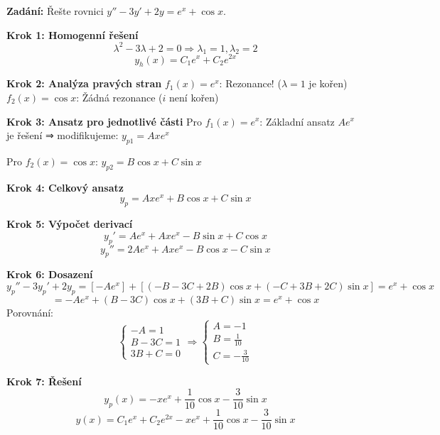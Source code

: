 \begin{example}
\label{ex:kombinace-exp-goniom}

\noindent\textbf{Zadání:} Řešte rovnici $y'' - 3y' + 2y = e^{x} + \cos x$.

\vspace{1.5\baselineskip}

\noindent\textbf{Krok 1: Homogenní řešení}
\[
\lambda^2 - 3\lambda + 2 = 0 \Rightarrow \lambda_1 = 1, \lambda_2 = 2
\]
\[
y_h(x) = C_1 e^{x} + C_2 e^{2x}
\]

\vspace{1\baselineskip}

\noindent\textbf{Krok 2: Analýza pravých stran}
$f_1(x) = e^{x}$: Rezonance! ($\lambda = 1$ je kořen)
$f_2(x) = \cos x$: Žádná rezonance ($i$ není kořen)

\vspace{1\baselineskip}

\noindent\textbf{Krok 3: Ansatz pro jednotlivé části}
Pro $f_1(x) = e^{x}$: Základní ansatz $Ae^{x}$ je řešení ⇒ modifikujeme: $y_{p1} = Axe^{x}$

Pro $f_2(x) = \cos x$: $y_{p2} = B\cos x + C\sin x$

\vspace{1\baselineskip}

\noindent\textbf{Krok 4: Celkový ansatz}
\[
y_p = Axe^{x} + B\cos x + C\sin x
\]

\vspace{1\baselineskip}

\noindent\textbf{Krok 5: Výpočet derivací}
\[
y_p' = Ae^{x} + Axe^{x} - B\sin x + C\cos x
\]
\[
y_p'' = 2Ae^{x} + Axe^{x} - B\cos x - C\sin x
\]

\vspace{1\baselineskip}

\noindent\textbf{Krok 6: Dosazení}
\[
y_p'' - 3y_p' + 2y_p = [-Ae^{x}] + [(-B - 3C + 2B)\cos x + (-C + 3B + 2C)\sin x] = e^{x} + \cos x
\]
\[
= -Ae^{x} + (B - 3C)\cos x + (3B + C)\sin x = e^{x} + \cos x
\]
Porovnání:
\[
\begin{cases}
-A = 1 \\
B - 3C = 1 \\
3B + C = 0
\end{cases}
\Rightarrow
\begin{cases}
A = -1 \\
B = \frac{1}{10} \\
C = -\frac{3}{10}
\end{cases}
\]

\vspace{1\baselineskip}

\noindent\textbf{Krok 7: Řešení}
\[
y_p(x) = -xe^{x} + \frac{1}{10}\cos x - \frac{3}{10}\sin x
\]
\[
y(x) = C_1 e^{x} + C_2 e^{2x} - xe^{x} + \frac{1}{10}\cos x - \frac{3}{10}\sin x
\]

\end{example}

